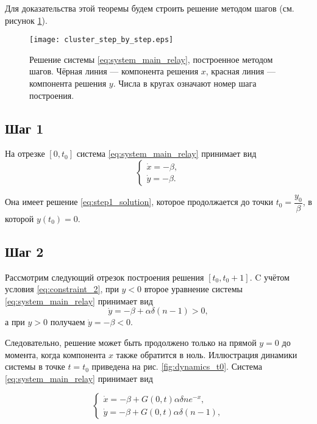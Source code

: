 Для доказательства этой теоремы будем строить решение методом шагов (см. рисунок \ref{fig:cluster_step_by_step}).

\begin{figure}[!ht]
	\centering
	\texttt{[image: cluster\_step\_by\_step.eps]}
	\caption{Решение системы \eqref{eq:system_main_relay}, построенное методом шагов. Чёрная линия --- компонента решения $x$, красная линия --- компонента решения $y$. Числа в кругах означают номер шага построения.}
	\label{fig:cluster_step_by_step}
\end{figure}


\subsection{Шаг 1}
На отрезке $[0, t_0]$ система \eqref{eq:system_main_relay} принимает вид
%
\begin{equation}
	\label{eq:step1_system}
	\begin{cases}
		\dot{x} = -\beta,\\
		\dot{y} = -\beta.
	\end{cases}
\end{equation}

Она имеет решение \eqref{eq:step1_solution}, которое продолжается до точки $t_0 = \dfrac{y_0}{\beta}$, в которой $y(t_0) = 0$.

\subsection{Шаг 2}

Рассмотрим следующий отрезок построения решения $[t_0, t_0 + 1]$. C учётом условия \eqref{eq:constraint_2}, при $y < 0$ второе уравнение системы \eqref{eq:system_main_relay} принимает вид
\[
\dot{y} = -\beta + \alpha \delta (n - 1) > 0,
\]
а при $y > 0$ получаем $\dot{y} = -\beta < 0$.

Следовательно, решение может быть продолжено только на прямой $y = 0$ до момента, когда компонента $x$ также обратится в ноль. Иллюстрация динамики системы в точке $t= t_0$ приведена на рис. \ref{fig:dynamics_t0}. Система \eqref{eq:system_main_relay} принимает вид

\begin{equation}
	\label{eq:step2_system}
	\begin{cases}
		\dot{x} = -\beta + G(0, t) \alpha \delta n e^{-x},\\
		\dot{y} = -\beta + G(0, t) \alpha \delta (n - 1),
	\end{cases}
\end{equation}

